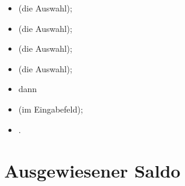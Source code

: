 \begin{itemize}
	\item {} (die Auswahl);
	\item {} (die Auswahl);
	\item {} (die Auswahl);
	\item {} (die Auswahl);
	\item[]\hspace{-12pt} dann%
	\item {} (im Eingabefeld);
	\item {}.
\end{itemize}


\section{Ausgewiesener Saldo\label{transactions-balance}}


